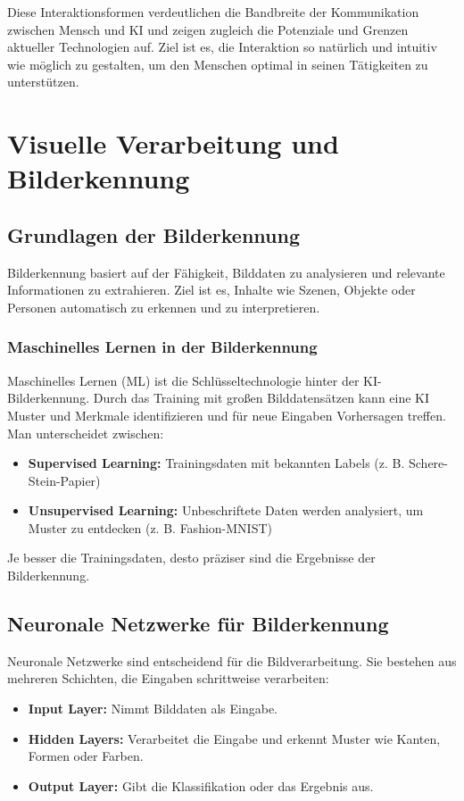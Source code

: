 \documentclass[a4paper,12pt]{article}
\begin{document}
Diese Interaktionsformen verdeutlichen die Bandbreite der Kommunikation zwischen Mensch und KI und zeigen zugleich die Potenziale und Grenzen aktueller Technologien auf. Ziel ist es, die Interaktion so natürlich und intuitiv wie möglich zu gestalten, um den Menschen optimal in seinen Tätigkeiten zu unterstützen.

\section{Visuelle Verarbeitung und Bilderkennung}
\subsection{Grundlagen der Bilderkennung}
Bilderkennung basiert auf der Fähigkeit, Bilddaten zu analysieren und relevante Informationen zu extrahieren. Ziel ist es, Inhalte wie Szenen, Objekte oder Personen automatisch zu erkennen und zu interpretieren.

\subsubsection{Maschinelles Lernen in der Bilderkennung}
Maschinelles Lernen (ML) ist die Schlüsseltechnologie hinter der KI-Bilderkennung. Durch das Training mit großen Bilddatensätzen kann eine KI Muster und Merkmale identifizieren und für neue Eingaben Vorhersagen treffen. Man unterscheidet zwischen:
\begin{itemize}
    \item \textbf{Supervised Learning:} Trainingsdaten mit bekannten Labels (z. B. Schere-Stein-Papier)
    \item \textbf{Unsupervised Learning:} Unbeschriftete Daten werden analysiert, um Muster zu entdecken (z. B. Fashion-MNIST)
\end{itemize}

Je besser die Trainingsdaten, desto präziser sind die Ergebnisse der Bilderkennung.

\subsection{Neuronale Netzwerke für Bilderkennung}
Neuronale Netzwerke sind entscheidend für die Bildverarbeitung. Sie bestehen aus mehreren Schichten, die Eingaben schrittweise verarbeiten:
\begin{itemize}
    \item \textbf{Input Layer:} Nimmt Bilddaten als Eingabe.
    \item \textbf{Hidden Layers:} Verarbeitet die Eingabe und erkennt Muster wie Kanten, Formen oder Farben.
    \item \textbf{Output Layer:} Gibt die Klassifikation oder das Ergebnis aus.
\end{itemize}
\end{document}
